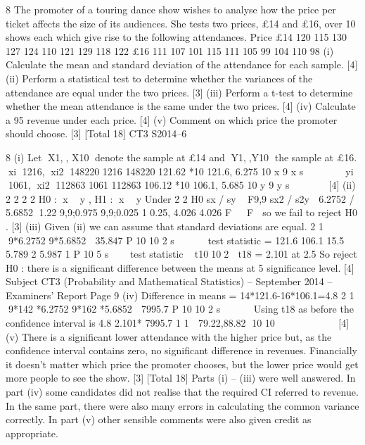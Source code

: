 8 The promoter of a touring dance show wishes to analyse how the price per ticket
affects the size of its audiences. She tests two prices, £14 and £16, over 10 shows
each which give rise to the following attendances.
Price
£14 120 115 130 127 124 110 121 129 118 122
£16 111 107 101 115 111 105 99 104 110 98
(i) Calculate the mean and standard deviation of the attendance for each sample.
[4]
(ii) Perform a statistical test to determine whether the variances of the attendance
are equal under the two prices. [3]
(iii) Perform a t-test to determine whether the mean attendance is the same under
the two prices. [4]
(iv) Calculate a 95%
revenue under each price. [4]
(v) Comment on which price the promoter should choose. [3]
[Total 18]
CT3 S2014–6


8 (i) Let X1,, X10 denote the sample at £14 and Y1,,Y10 the sample at £16.
xi 1216, xi2 148220
1216 148220 121.62 *10 121.6, 6.275
10 x 9 x s 
    
yi 1061, xi2 112863
1061 112863 106.12 *10 106.1, 5.685
10 y 9 y s 
     [4]
(ii) 2 2 2 2
H0 : x  y , H1 : x  y
Under 2 2
H0 sx / sy ~ F9,9
sx2 / s2y  6.2752 / 5.6852 1.22
9,9;0.975 9,9;0.025
1 0.25, 4.026
4.026
F   F  so we fail to reject H0 . [3]
(iii) Given (ii) we can assume that standard deviations are equal.
2 1 9*6.2752 9*5.6852  35.847
P 10 10 2 s   
 
test statistic = 121.6 106.1 15.5 5.789
2 5.987 1
P 10 5 s

 
test statistic ~ t10102  t18 = 2.101 at 2.5%
So reject H0 : there is a significant difference between the means at 5%
significance level. [4]
Subject CT3 (Probability and Mathematical Statistics) – September 2014 – Examiners’ Report
Page 9
(iv) Difference in means = 14*121.6-16*106.1=4.8
2 1 9*142 *6.2752 9*162 *5.6852  7995.7
P 10 10 2 s   
 
Using t18 as before the confidence interval is
4.8 2.101* 7995.7 1 1  79.22,88.82
10 10
       
 
[4]
(v) There is a significant lower attendance with the higher price but, as the
confidence interval contains zero, no significant difference in revenues.
Financially it doesn’t matter which price the promoter chooses, but the lower
price would get more people to see the show. [3]
[Total 18]
Parts (i) – (iii) were well answered. In part (iv) some candidates did not realise that the
required CI referred to revenue. In the same part, there were also many errors in calculating
the common variance correctly. In part (v) other sensible comments were also given credit
as appropriate.
